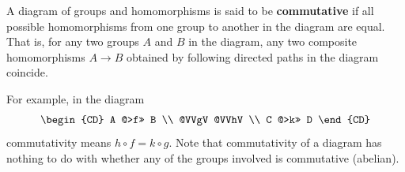A diagram of groups and homomorphisms is said to be \textbf{commutative} if all possible homomorphisms from one group to another in the diagram are equal. That is, for any two groups $A$ and $B$ in the diagram, any two composite homomorphisms $A \to B$ obtained by following directed paths in the diagram coincide.

For example, in the diagram
\[
\begin{CD}
A @>f>> B \\
@VVgV @VVhV \\
C @>k>> D
\end{CD}
\]
commutativity means $h \circ f = k \circ g$. Note that commutativity of a diagram has nothing to do with whether any of the groups involved is commutative (abelian).

